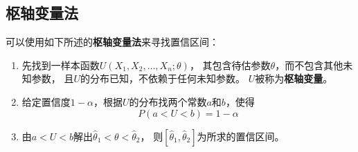 \subsection{枢轴变量法}
可以使用如下所述的\textbf{枢轴变量法}来寻找置信区间：
\begin{enumerate}
  \item
  先找到一样本函数$U(X_1,X_2,\dots,X_n;\theta)$，
  其包含待估参数$\theta$，而不包含其他未知参数，
  且$U$的分布已知，不依赖于任何未知参数。
  $U$被称为\textbf{枢轴变量}。
  \item
  给定置信度$1-\alpha$，根据$U$的分布找两个常数$a$和$b$，使得
  \begin{displaymath}
    P(a<U<b)=1-\alpha
  \end{displaymath}
  \item
  由$a<U<b$解出$\hat{\theta}_1<\theta<\hat{\theta}_2$，
  则$[\hat{\theta}_1,\hat{\theta}_2]$为所求的置信区间。
\end{enumerate}

